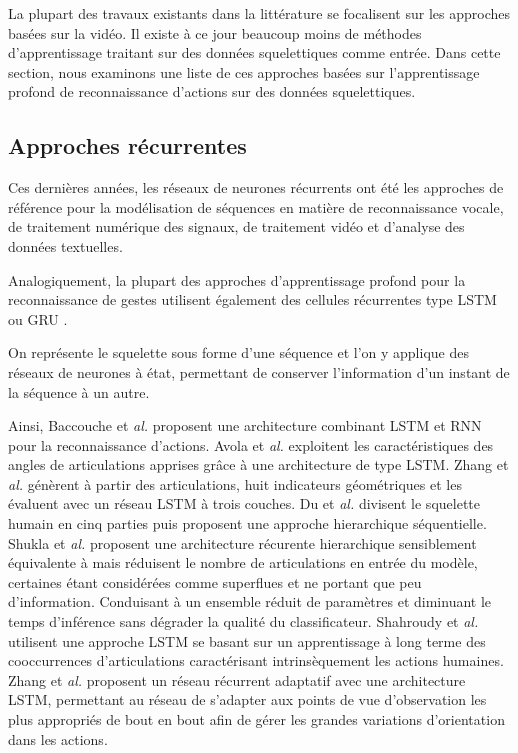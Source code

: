 La plupart des travaux existants dans la littérature se focalisent sur les approches basées sur la vidéo. Il existe à ce jour beaucoup moins de méthodes d'apprentissage traitant sur des données squelettiques comme entrée. Dans cette section, nous examinons une liste de ces approches basées sur l'apprentissage profond de reconnaissance d'actions sur des données squelettiques.

\subsection{Approches récurrentes}

Ces dernières années, les réseaux de neurones récurrents ont  été les approches de référence pour la modélisation de séquences en matière de reconnaissance vocale, de traitement numérique des signaux, de traitement vidéo et d'analyse des données textuelles. 


Analogiquement, la plupart des approches d'apprentissage profond pour la reconnaissance de gestes utilisent également des cellules récurrentes type LSTM \cite{hochreiter1997long} ou GRU \cite{2014arXiv1406.1078C}.

On représente le squelette sous forme d’une séquence et l'on y applique des réseaux de neurones à état, permettant de conserver l’information d’un instant de la séquence à un autre.

Ainsi, Baccouche et\textit{ al.}\cite{baccouche2011sequential} proposent une architecture combinant LSTM et RNN pour la reconnaissance d'actions.
Avola et\textit{ al.} \cite{avola2018exploiting} exploitent les caractéristiques des angles de articulations apprises grâce à une architecture de type LSTM. 
Zhang et\textit{ al.}\cite{zhang2017geometric} génèrent à partir des articulations, huit indicateurs géométriques et les évaluent avec un réseau LSTM à trois couches.
Du et\textit{ al.}\cite{du2015hierarchical} divisent le squelette humain en cinq parties puis proposent une approche hierarchique séquentielle.
Shukla et\textit{ al.}\cite{shukla2017recurrent} proposent une architecture récurente hierarchique sensiblement équivalente à \cite{du2015hierarchical} mais réduisent le nombre de articulations en entrée du modèle, certaines étant considérées comme superflues et ne portant que peu d'information. Conduisant à un ensemble réduit de paramètres et diminuant le temps d'inférence sans dégrader la qualité du classificateur.
Shahroudy et\textit{ al.}\cite{shahroudy2016ntu} utilisent une approche LSTM se basant sur un apprentissage à long terme des cooccurrences d'articulations caractérisant intrinsèquement les actions humaines.
Zhang et\textit{ al.}\cite{zhang2017view} proposent un réseau récurrent adaptatif avec une architecture LSTM, permettant au réseau de s'adapter aux points de vue d'observation les plus appropriés de bout en bout afin de gérer les grandes variations d'orientation dans les actions.

